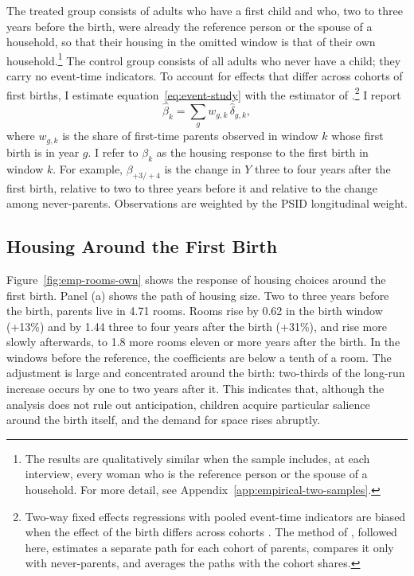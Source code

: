 The treated group consists of adults who have a first child and who, two to
three years before the birth, were already the reference person or the
spouse of a household, so that their housing in the omitted window is that
of their own household.\footnote{The results are qualitatively similar when the sample includes,
at each interview, every woman who is the reference person or the spouse
of a household. For more detail, see
Appendix~\ref{app:empirical-two-samples}.} The control group consists of all adults who
never have a child; they carry no event-time indicators. To account for
effects that differ across cohorts of first births, I estimate
equation~\eqref{eq:event-study} with the estimator of
\citet{sunAbrahamDynamicEffects2021}.\footnote{Two-way fixed effects regressions with pooled event-time indicators are
biased when the effect of the birth differs across cohorts
\citep{goodmanbaconDifferenceinDifferencesVariationTreatment2021}. The
method of \citet{sunAbrahamDynamicEffects2021}, followed here, estimates a
separate path for each cohort of parents, compares it only with
never-parents, and averages the paths with the cohort shares.} I report
\begin{equation}
\hat\beta_k=\sum_g w_{g,k}\,\hat\delta_{g,k},
\label{eq:event-study-weights}
\end{equation}
where $w_{g,k}$ is the share of first-time parents observed in window $k$
whose first birth is in year $g$. I refer to $\beta_k$ as the housing response to the first birth in window $k$.
For example, $\beta_{+3/+4}$ is the change in $Y$ three to four years after
the first birth, relative to two to three years before it and relative to
the change among never-parents. Observations are weighted by the PSID longitudinal weight.

\subsection{Housing Around the First Birth}
\label{sec:emp-first-birth}

Figure~\ref{fig:emp-rooms-own} shows the response of housing choices around
the first birth. Panel (a) shows the path of housing size. Two to three years before the birth, parents live in 4.71 rooms.
Rooms rise by 0.62 in the birth window (+13\%) and by 1.44 three to
four years after the birth (+31\%), and rise more slowly afterwards, to 1.8 more rooms eleven or more years after the birth. In the windows before the reference, the coefficients are below a tenth of a room.
The adjustment is large and concentrated around the birth: two-thirds of
the long-run increase occurs by one to two years after it. This indicates
that, although the analysis does not rule out anticipation, children
acquire particular salience around the birth itself, and the demand for
space rises abruptly.

